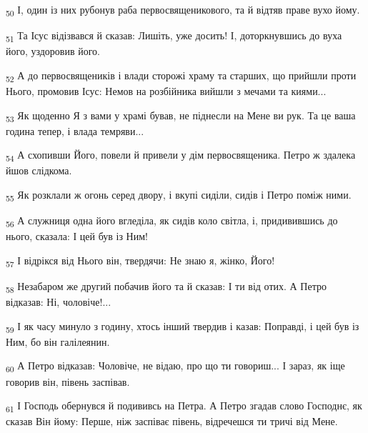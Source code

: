 \begin{tcolorbox}
\textsubscript{50} І, один із них рубонув раба первосвященикового, та й відтяв праве вухо йому.
\end{tcolorbox}
\begin{tcolorbox}
\textsubscript{51} Та Ісус відізвався й сказав: Лишіть, уже досить! І, доторкнувшись до вуха його, уздоровив його.
\end{tcolorbox}
\begin{tcolorbox}
\textsubscript{52} А до первосвящеників і влади сторожі храму та старших, що прийшли проти Нього, промовив Ісус: Немов на розбійника вийшли з мечами та киями...
\end{tcolorbox}
\begin{tcolorbox}
\textsubscript{53} Як щоденно Я з вами у храмі бував, не піднесли на Мене ви рук. Та це ваша година тепер, і влада темряви...
\end{tcolorbox}
\begin{tcolorbox}
\textsubscript{54} А схопивши Його, повели й привели у дім первосвященика. Петро ж здалека йшов слідкома.
\end{tcolorbox}
\begin{tcolorbox}
\textsubscript{55} Як розклали ж огонь серед двору, і вкупі сиділи, сидів і Петро поміж ними.
\end{tcolorbox}
\begin{tcolorbox}
\textsubscript{56} А служниця одна його вгледіла, як сидів коло світла, і, придивившись до нього, сказала: І цей був із Ним!
\end{tcolorbox}
\begin{tcolorbox}
\textsubscript{57} І відрікся від Нього він, твердячи: Не знаю я, жінко, Його!
\end{tcolorbox}
\begin{tcolorbox}
\textsubscript{58} Незабаром же другий побачив його та й сказав: І ти від отих. А Петро відказав: Ні, чоловіче!...
\end{tcolorbox}
\begin{tcolorbox}
\textsubscript{59} І як часу минуло з годину, хтось інший твердив і казав: Поправді, і цей був із Ним, бо він галілеянин.
\end{tcolorbox}
\begin{tcolorbox}
\textsubscript{60} А Петро відказав: Чоловіче, не відаю, про що ти говориш... І зараз, як іще говорив він, півень заспівав.
\end{tcolorbox}
\begin{tcolorbox}
\textsubscript{61} І Господь обернувся й подививсь на Петра. А Петро згадав слово Господнє, як сказав Він йому: Перше, ніж заспіває півень, відречешся ти тричі від Мене.
\end{tcolorbox}
